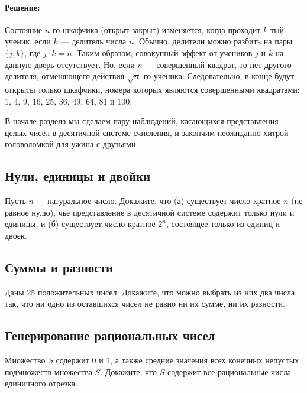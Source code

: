 \paragraph{Решение:}

Состояние $n$-го шкафчика (открыт-закрыт) изменяется, когда проходит $k$-тый ученик, если $k$ --- делитель числа $n$.
Обычно, делители можно разбить на пары $\{j,k\}$, где $j\cdot k=n$.
Таким образом, совокупный эффект от учеников $j$ и $k$ на данную дверь отсутствует. %
Но, если $n$ --- совершенный квадрат, то нет другого делителя, отменяющего действия $\sqrt{n}$-го ученика.
Следовательно, в конце будут открыты только шкафчики, номера которых являются совершенными квадратами: 1, 4, 9, 16, 25, 36, 49, 64, 81 и 100.\heart
 
В начале раздела мы сделаем пару наблюдений, касающихся представления целых чисел в десятичной системе счисления, и закончим неожиданно хитрой головоломкой для ужина с друзьями. %

\subsection*{Нули, единицы и двойки}%

Пусть $n$ --- натуральное число.
Докажите, что (а) существует число кратное $n$ (не равное нулю), чьё представление в десятичной системе содержит только нули и единицы, и
(б) существует число кратное $2^n$, состоящее только из единиц и двоек.

\subsection*{Суммы и разности} %

Даны 25 положительных чисел.
Докажите, что можно выбрать из них два числа, так, что ни одно из оставшихся чисел не равно ни их сумме, ни их разности.

\subsection*{Генерирование рациональных чисел}%

Множество $S$ содержит 0 и 1, а также средние значения всех конечных непустых подмножеств множества $S$.
Докажите, что $S$ содержит все рациональные числа единичного отрезка.


